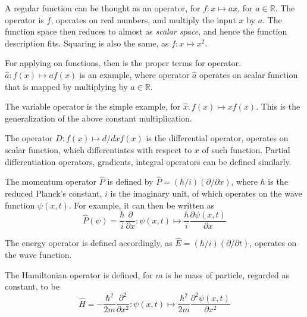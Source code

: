 \begin{description}[leftmargin = 2.5cm]
    \item[Regular function] A regular function can be thought as  an operator, for $f: x\mapsto ax$, for $a\in \mathbb{R}$. The operator is $f$, operates on real numbers, and multiply the input $x$ by $a$. The function space then reduces to almost as \textit{scalar space}, and hence the function description fits. Squaring is also the same, as $f: x\mapsto x^{2}$. 
    \item[Functional application] For applying on functions, then is the proper terms for operator. $\hat{a}:f(x)\mapsto af(x)$ is an example, where operator $\hat{a}$ operates on scalar function that is mapped by multiplying by $a\in\mathbb{R}$.
    \item[Variable operator] The variable operator is the simple example, for $\hat{x}:f(x)\mapsto xf(x)$. This is the generalization of the above constant multiplication. 
    \item[Differential operator] The operator $D:f(x)\mapsto d/dx f(x)$ is the differential operator, operates on scalar function, which differentiates with respect to $x$ of such function. Partial differentiation operators, gradients, integral operators can be defined similarly. 
    \item[Momentum operator] The momentum operator $\hat{P}$ is defined by $\hat{P}= (\hbar/i)(\partial/\partial x)$, where $\hbar$ is the reduced Planck's constant, $i$ is the imaginary unit, of which operates on the wave function $\psi(x,t)$. For example, it can then be written as \begin{equation}
        \hat{P}(\psi) = \frac{\hbar}{i}\frac{\partial}{\partial x}:\psi(x,t)\mapsto\frac{\hbar}{i}\frac{\partial\psi(x,t)}{\partial x} 
    \end{equation}   
    \item[Energy operator] The energy operator is defined accordingly, as $\hat{E}=(\hbar/i)(\partial/\partial t)$, operates on the wave function. 
    \item[Hamiltonian operator] The Hamiltonian operator is defined, for $m$ is he mass of particle, regarded as constant, to be \begin{equation}
        \hat{H} = - \frac{\hbar^{2}}{2m} \frac{\partial^{2}}{\partial x^{2}}: \psi(x,t)\mapsto  \frac{\hbar^{2}}{2m} \frac{\partial^{2}\psi(x,t)}{\partial x^{2}}
    \end{equation} 
\end{description}

